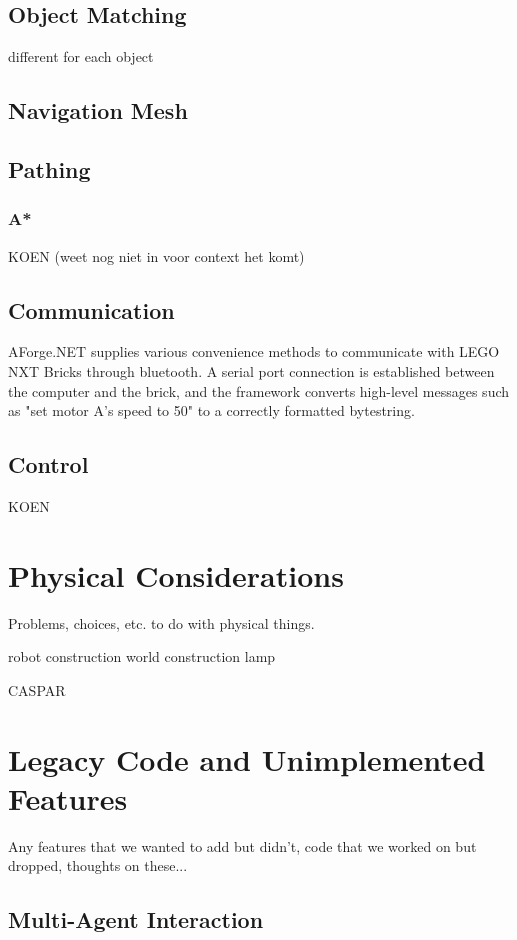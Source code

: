 \documentclass[10pt,twocolumn]{article}
\begin{document}
\subsection{Object Matching}
different for each object

\subsection{Navigation Mesh}

\subsection{Pathing}

\subsubsection{A*}
KOEN (weet nog niet in voor context het komt)

\subsection{Communication}
AForge.NET supplies various convenience methods to communicate with LEGO NXT Bricks through bluetooth. A serial port connection is established between the computer and the brick, and the framework converts high-level messages such as "set motor A's speed to 50" to a correctly formatted bytestring.

\subsection{Control}
KOEN

\section{Physical Considerations}
Problems, choices, etc. to do with physical things.

robot construction
world construction
lamp

CASPAR

\section{Legacy Code and Unimplemented Features}
Any features that we wanted to add but didn't, code that we worked on but dropped, thoughts on these...

\subsection{Multi-Agent Interaction}
\end{document}
